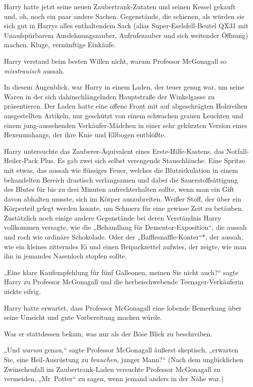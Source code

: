 {\later

Harry hatte jetzt seine neuen Zaubertrank-Zutaten und seinen Kessel gekauft und, oh, noch ein paar andere Sachen. Gegenstände, die schienen, als würden sie sich gut in Harrys alles enthaltendem Sack (alias Super-Eselsfell-Beutel QX31 mit Unaufspürbarem Ausdehnungszauber, Aufrufezauber und sich weitender Öffnung) machen. Kluge, vernünftige Einkäufe.

Harry verstand beim besten Willen nicht, warum Professor McGonagall so \emph{misstrauisch} aussah.

In diesem Augenblick, war Harry in einem Laden, der teuer genug war, um seine Waren in der sich dahinschlängelnden Hauptstraße der Winkelgasse zu präsentieren. Der Laden hatte eine offene Front mit auf abgeschrägten Holzreihen ausgestellten Artikeln, nur geschützt von einem schwachen grauen Leuchten und einem jung-aussehenden Verkäufer-Mädchen in einer sehr gekürzten Version eines Hexenumhangs, der ihre Knie und Ellbogen entblößte.

Harry untersuchte das Zauberer-Äquivalent eines Erste-Hilfe-Kastens, das Notfall-Heiler-Pack Plus. Es gab zwei sich selbst verengende Stauschläuche. Eine Spritze mit etwas, das aussah wie flüssiges Feuer, welches die Blutzirkulation in einem behandelten Bereich drastisch verlangsamen und dabei die Sauerstoffsättigung des Blutes für bis zu drei Minuten aufrechterhalten sollte, wenn man ein Gift davon abhalten musste, sich im Körper auszubreiten. Weißer Stoff, der über ein Körperteil gelegt werden konnte, um Schmerz für eine gewisse Zeit zu betäuben. Zustätzlich noch einige andere Gegenstände bei deren Verständnis Harry vollkommen versagte, wie die „Behandlung für Dementor-Exposition“, die aussah und roch wie ordinäre Schokolade. Oder der „Bafflesnaffle-Konter“*, der aussah, wie ein kleines zitterndes Ei und einen Beipackzettel aufwies, der zeigte, wie man ihn in jemandes Nasenloch stopfen sollte.

„Eine klare Kaufempfehlung für fünf Galleonen, meinen Sie nicht auch?“ sagte Harry zu Professor McGonagall und die herbeischwebende Teenager-Verkäuferin nickte eifrig.

Harry hatte erwartet, dass Professor McGonagall eine lobende Bemerkung über seine Umsicht und gute Vorbereitung machen würde.

Was er stattdessen bekam, was nur als der Böse Blick zu beschreiben.

„Und \emph{warum} genau,“ sagte Professor McGonagall äußerst skeptisch, „erwarten Sie, eine Heil-Ausrüstung zu \emph{brauchen}, junger Mann?“ (Nach dem unglücklichen Zwinschenfall im Zaubertrank-Laden versuchte Professor McGonagall zu vermeiden, „Mr~Potter“ zu sagen, wenn jemand anders in der Nähe war.)

}
